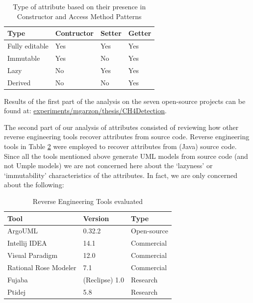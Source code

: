 \begin{table}
\caption{Type of attribute based on their presence in Constructor and Access Method Patterns}
\label{table:constructorFrequency}
\centering
\begin{tabular}{llll}
\toprule
\rowcolor[HTML]{BBDAFF}
\textbf{Type}   & \textbf{Contructor}    & \textbf{Setter}       &  \textbf{Getter} \\ 
\hline
 Fully editable & Yes & Yes & Yes \\
  Immutable & Yes & No & Yes \\
   Lazy & No & Yes & Yes \\
    Derived & No & No & Yes \\
\hline
\end{tabular}
\end{table}

Results of the first part of the analysis on the seven open-source projects can be found at:
\url{experiments/mgarzon/thesis/CH4Detection}.

The second part of our analysis of attributes consisted of reviewing how other reverse engineering tools 
recover attributes from source code. Reverse engineering tools in Table \ref{table:toolsReverse} were employed to recover attributes from (Java) source code. Since all the tools mentioned above generate UML models from source code (and not Umple models) we are not concerned here about the `lazyness' or `immutability' characteristics of the attributes. In fact, we are only concerned about the following:

\begin{table}[h]
\caption{Reverse Engineering Tools evaluated}
\label{table:toolsReverse}
\centering
\begin{tabular}{lll}
\toprule
\rowcolor[HTML]{BBDAFF}
\textbf{Tool}   & \textbf{Version}  & \textbf{Type}\\ 
\hline
 ArgoUML \cite{ArgoUML} & 0.32.2 & Open-source \\
 Intellij IDEA \cite{IdeaTool} & 14.1 & Commercial \\
 Visual Paradigm \cite{VisualParadigm} & 12.0 & Commercial  \\
 Rational Rose Modeler  \cite{ROSE} & 7.1 & Commercial\\
 Fujaba \cite{Fujaba} & (Reclipse) 1.0 & Research\\
 Ptidej \cite{ptidejTool} & 5.8 & Research\\
\hline
\end{tabular}
\end{table}

